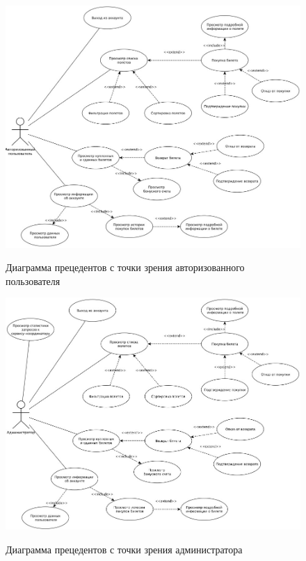 \begin{figure}[H]
	\begin{center}
		{\includegraphics[scale = 0.6]{img/use-case/auth-user.jpg}}
		\caption{Диаграмма прецедентов с точки зрения авторизованного пользователя}
		\label{fig:use-case-auth}
	\end{center}
\end{figure}

\begin{figure}[H]
	\begin{center}
		{\includegraphics[scale = 0.6]{img/use-case/admin.jpg}}
		\caption{Диаграмма прецедентов с точки зрения администратора}
		\label{fig:use-case-admin}
	\end{center}
\end{figure}
